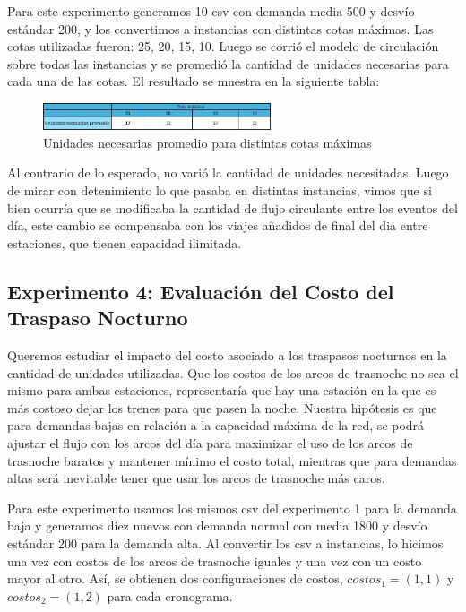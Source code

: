 \documentclass{article}
\begin{document}
Para este experimento generamos 10 csv con demanda media 500 y desvío estándar 200, y los convertimos a instancias con distintas cotas máximas. Las cotas utilizadas fueron: 25, 20, 15, 10. Luego se corrió el modelo de circulación sobre todas las instancias y se promedió la cantidad de unidades necesarias para cada una de las cotas. El resultado se muestra en la siguiente tabla:

\begin{figure}[H]
    \centering
    \includegraphics[width=0.6\textwidth]{exp3/unidades_promedio.png}
    \caption{Unidades necesarias promedio para distintas cotas máximas}
    \label{fig:ejemplo}
\end{figure}

Al contrario de lo esperado, no varió la cantidad de unidades necesitadas. Luego de mirar con detenimiento lo que pasaba en distintas instancias, vimos que si bien ocurría que se modificaba la cantidad de flujo circulante entre los eventos del día, este cambio se compensaba con los viajes añadidos de final del dia entre estaciones, que tienen capacidad ilimitada.

\subsection*{Experimento 4: Evaluación del Costo del Traspaso Nocturno}

Queremos estudiar el impacto del costo asociado a los traspasos nocturnos en la cantidad de unidades utilizadas. Que los costos de los arcos de trasnoche no sea el mismo para ambas estaciones, representaría que hay una estación en la que es más costoso dejar los trenes para que pasen la noche. Nuestra hipótesis es que para demandas bajas en relación a la capacidad máxima de la red, se podrá ajustar el flujo con los arcos del día para maximizar el uso de los arcos de trasnoche baratos y mantener mínimo el costo total, mientras que para demandas altas será inevitable tener que usar los arcos de trasnoche más caros.

Para este experimento usamos los mismos csv del experimento 1 para la demanda baja y generamos diez nuevos con demanda normal con media 1800 y desvío estándar 200 para la demanda alta. Al convertir los csv a instancias, lo hicimos una vez con costos de los arcos de trasnoche iguales  y una vez con un costo mayor al otro. Así, se obtienen dos configuraciones de costos, $costos_1 = (1, 1)$ y $costos_2 = (1, 2)$ para cada cronograma.  
\end{document}
